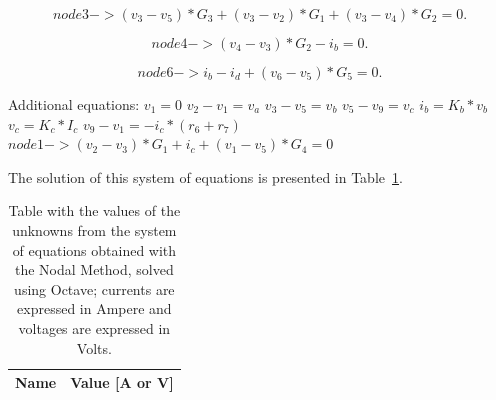 \begin{equation}
  node 3 -> (v_3 - v_5)*G_3 + (v_3 - v_2)*G_1 + (v_3 - v_4)*G_2 = 0.
  \label{eq:kvl}
\end{equation}

\begin{equation}
  node 4 -> (v_4 - v_3)*G_2 - i_b = 0.
\end{equation}

\begin{equation}
  node 6 -> i_b - i_d + (v_6 - v_5)*G_5 = 0.
  \label{eq:kvl2}
\end{equation}

Additional equations:
$v_1= 0$
$v_2 - v_1 = v_a$
$v_3 - v_5 = v_b$
$v_5 - v_9 = v_c$
$i_b = K_b*v_b$
$v_c = K_c*I_c$
$v_9 - v_1 = -i_c*(r_6 + r_7)$
$node 1 -> (v_2 - v_3)*G_1 + i_c +(v_1 - v_5)*G_4 = 0$

The solution of this system of equations is presented in Table~\ref{tab:nodal}. 

\begin{table}[h]
  \centering
  \begin{tabular}{|l|r|}
    \hline    
    {\bf Name} & {\bf Value [A or V]} \\ \hline
    
  \end{tabular}
  \caption{Table with the values of the unknowns from the system of equations obtained with the Nodal Method, solved using Octave; currents are expressed in Ampere and voltages are expressed in Volts.}
  \label{tab:nodal}
\end{table}




